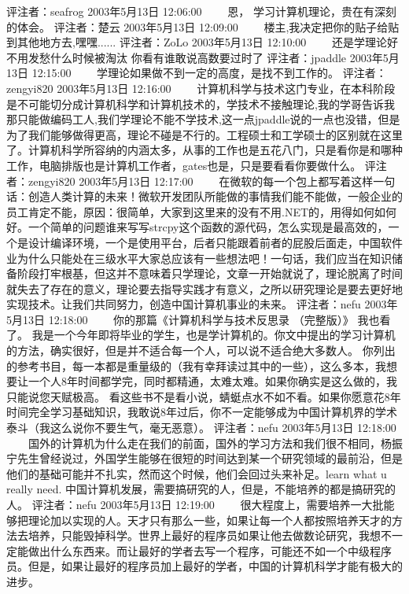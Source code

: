 评注者：seafrog	2003年5月13日 12:06:00
　　恩，
学习计算机理论，贵在有深刻的体会。
评注者：楚云	2003年5月13日 12:09:00
　　楼主,我决定把你的贴子给贴到其他地方去,嘿嘿......
评注者：ZoLo	2003年5月13日 12:10:00
　　还是学理论好 
不用发愁什么时候被淘汰 
你看有谁敢说高数要过时了
评注者：jpaddle	2003年5月13日 12:15:00
　　学理论如果做不到一定的高度，是找不到工作的。
评注者：zengyi820	2003年5月13日 12:16:00
　　计算机科学与技术这门专业，在本科阶段是不可能切分成计算机科学和计算机技术的，学技术不接触理论,我的学哥告诉我那只能做编码工人,我们学理论不能不学技术,这一点jpaddle说的一点也没错，但是为了我们能够做得更高，理论不碰是不行的。工程硕士和工学硕士的区别就在这里了。计算机科学所容纳的内涵太多，从事的工作也是五花八门，只是看你是和哪种工作，电脑排版也是计算机工作者，gates也是，只是要看看你要做什么。
评注者：zengyi820	2003年5月13日 12:17:00
　　在微软的每一个包上都写着这样一句话：创造人类计算的未来！微软开发团队所能做的事情我们能不能做，一般企业的员工肯定不能，原因：很简单，大家到这里来的没有不用.NET的，用得如何如何好。一个简单的问题谁来写写strcpy这个函数的源代码，怎么实现是最高效的，一个是设计编译环境，一个是使用平台，后者只能跟着前者的屁股后面走，中国软件业为什么只能处在三级水平大家总应该有一些想法吧！一句话，我们应当在知识储备阶段打牢根基，但这并不意味着只学理论，文章一开始就说了，理论脱离了时间就失去了存在的意义，理论要去指导实践才有意义，之所以研究理论是要去更好地实现技术。让我们共同努力，创造中国计算机事业的未来。
评注者：nefu	2003年5月13日 12:18:00
　　你的那篇《计算机科学与技术反思录 （完整版）》 我也看了。 
我是一个今年即将毕业的学生，也是学计算机的。你文中提出的学习计算机的方法，确实很好，但是并不适合每一个人，可以说不适合绝大多数人。 你列出的参考书目，每一本都是重量级的（我有幸拜读过其中的一些），这么多本，我想要让一个人8年时间都学完，同时都精通，太难太难。如果你确实是这么做的，我只能说您天赋极高。 看这些书不是看小说，蜻蜓点水不如不看。如果你愿意花8年时间完全学习基础知识，我敢说8年过后，你不一定能够成为中国计算机界的学术泰斗（我这么说你不要生气，毫无恶意）。
评注者：nefu	2003年5月13日 12:18:00
　　国外的计算机为什么走在我们的前面，国外的学习方法和我们很不相同，杨振宁先生曾经说过，外国学生能够在很短的时间达到某一个研究领域的最前沿，但是他们的基础可能并不扎实，然而这个时候，他们会回过头来补足。learn what u really need. 
中国计算机发展，需要搞研究的人，但是，不能培养的都是搞研究的人。
评注者：nefu	2003年5月13日 12:19:00
　　很大程度上，需要培养一大批能够把理论加以实现的人。天才只有那么一些，如果让每一个人都按照培养天才的方法去培养，只能毁掉科学。世界上最好的程序员如果让他去做数论研究，我想不一定能做出什么东西来。而让最好的学者去写一个程序，可能还不如一个中级程序员。但是，如果让最好的程序员加上最好的学者，中国的计算机科学才能有极大的进步。
